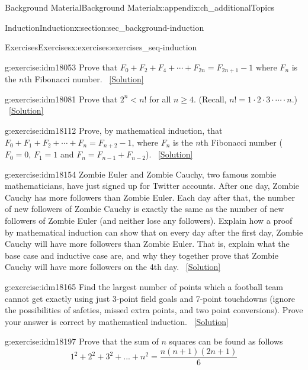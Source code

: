 \documentclass[oneside,10pt,]{book}
\numberwithin{equation}{chapter}
\newcommand{\lt}{<}
\begin{document}
\begin{appendixptx}{Background Material}{}{Background Material}{}{}{x:appendix:ch_additionalTopics}
\begin{sectionptx}{Induction}{}{Induction}{}{}{x:section:sec_background-induction}
\begin{exercises-subsection}{Exercises}{}{Exercises}{}{}{x:exercises:exercises_seq-induction}
\begin{divisionexercise}{4}{}{}{g:exercise:idm18053}
Prove that \(F_0 + F_2 + F_4 + \cdots + F_{2n} = F_{2n+1} - 1\) where \(F_n\) is the \(n\)th Fibonacci number.%
\qquad~\hfill{\tiny\hyperlink{g:solution:idm18059-main}{[Solution]}}\end{divisionexercise}%
\begin{divisionexercise}{5}{}{}{g:exercise:idm18081}%
Prove that \(2^n \lt  n!\) for all \(n \ge 4\). (Recall, \(n! = 1\cdot 2 \cdot 3 \cdot \cdots\cdot n\).)%
\qquad~\hfill{\tiny\hyperlink{g:solution:idm18087-main}{[Solution]}}\end{divisionexercise}%
\begin{divisionexercise}{6}{}{}{g:exercise:idm18112}%
Prove, by mathematical induction, that \(F_0 + F_1 + F_2 + \cdots + F_{n} = F_{n+2} - 1\), where \(F_n\) is the \(n\)th Fibonacci number (\(F_0 = 0\), \(F_1 = 1\) and \(F_n = F_{n-1} + F_{n-2}\)).%
\qquad~\hfill{\tiny\hyperlink{g:solution:idm18121-main}{[Solution]}}\end{divisionexercise}%
\begin{divisionexercise}{7}{}{}{g:exercise:idm18154}%
Zombie Euler and Zombie Cauchy, two famous zombie mathematicians, have just signed up for Twitter accounts. After one day, Zombie Cauchy has more followers than Zombie Euler. Each day after that, the number of new followers of Zombie Cauchy is exactly the same as the number of new followers of Zombie Euler (and neither lose any followers). Explain how a proof by mathematical induction can show that on every day after the first day, Zombie Cauchy will have more followers than Zombie Euler. That is, explain what the base case and inductive case are, and why they together prove that Zombie Cauchy will have more followers on the 4th day.%
\qquad~\hfill{\tiny\hyperlink{g:solution:idm18157-main}{[Solution]}}\end{divisionexercise}%
\begin{divisionexercise}{8}{}{}{g:exercise:idm18165}%
Find the largest number of points which a football team cannot get exactly using just 3-point field goals and 7-point touchdowns (ignore the possibilities of safeties, missed extra points, and two point conversions). Prove your answer is correct by mathematical induction.%
\qquad~\hfill{\tiny\hyperlink{g:solution:idm18168-main}{[Solution]}}\end{divisionexercise}%
\begin{divisionexercise}{9}{}{}{g:exercise:idm18197}%
Prove that the sum of \(n\) squares can be found as follows%
\begin{equation*}
1^2 +2^2 +3^2+...+n^2 = \frac{n(n+1)(2n+1)}{6}

\end{equation*}
\end{divisionexercise}
\end{exercises-subsection}
\end{sectionptx}
\end{appendixptx}
\end{document}
